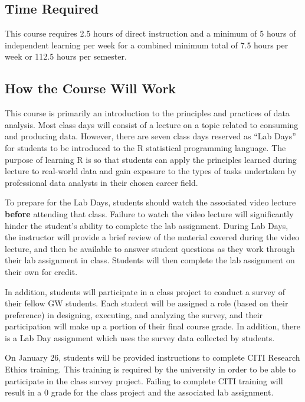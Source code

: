 \documentclass[12pt,letterpaper]{article}
\begin{document}
\subsection*{Time Required}

This course requires 2.5 hours of direct instruction and a minimum of
5 hours of independent learning per week for a combined minimum total
of 7.5 hours per week or 112.5 hours per semester.

\subsection*{How the Course Will Work}

This course is primarily an introduction to the principles and
practices of data analysis. Most class days will consist of a lecture
on a topic related to consuming and producing data. However, there
are seven class days reserved as ``Lab Days'' for students to be
introduced to the R statistical programming language. The purpose of
learning R is so that students can apply the principles learned
during lecture to real-world data and gain exposure to the types of
tasks undertaken by professional data analysts in their chosen career field.

To prepare for the Lab Days, students should watch the associated
video lecture \textbf{before} attending that class. Failure to watch
the video lecture will significantly hinder the student's ability to
complete the lab assignment. During Lab Days, the instructor will
provide a brief review of the material covered during the video
lecture, and then be available to answer student questions as they
work through their lab assignment in class. Students will then
complete the lab assignment on their own for credit.

In addition, students will participate in a class project to conduct
a survey of their fellow GW students. Each student will be assigned a
role (based on their preference) in designing, executing, and
analyzing the survey, and their participation will make up a portion
of their final course grade. In addition, there is a Lab Day
assignment which uses the survey data collected by students.

On January 26, students will be provided instructions to complete
CITI Research Ethics training. This training is required by the
university in order to be able to participate in the class survey
project. Failing to complete CITI training will result in a 0 grade
for the class project and the associated lab assignment.
\end{document}
